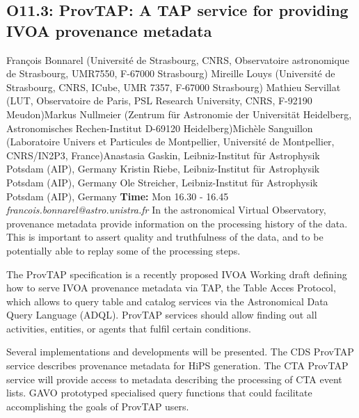 \documentclass{report}
\begin{document}
\subsection*{O11.3: ProvTAP: A TAP service for providing IVOA provenance metadata}
\bigskip
François Bonnarel (Université de Strasbourg, CNRS, Observatoire astronomique de Strasbourg, UMR7550, F-67000 Strasbourg) \newline Mireille Louys (Université de Strasbourg, CNRS, ICube, UMR 7357,  F-67000 Strasbourg) \newline  Mathieu Servillat (LUT, Observatoire de Paris, PSL Research University, CNRS, F-92190 Meudon)\newline  Markus Nullmeier (Zentrum für Astronomie der Universität Heidelberg, Astronomisches Rechen-Institut D-69120 Heidelberg)\newline Michèle Sanguillon (Laboratoire Univers et Particules de Montpellier, Université de Montpellier, CNRS/IN2P3, France)\newline  Anastasia Gaskin, Leibniz-Institut für Astrophysik Potsdam (AIP), Germany
Kristin Riebe, Leibniz-Institut für Astrophysik Potsdam (AIP), Germany
Ole Streicher, Leibniz-Institut für Astrophysik Potsdam (AIP), Germany\newline\newline
{\bf Time:} Mon 16.30 - 16.45\newline
\newline
{\it francois.bonnarel@astro.unistra.fr}\newline
\newline\newline
In the astronomical Virtual Observatory, provenance metadata provide
information on the processing history of the data. This is important to
assert quality and truthfulness of the data, and to be potentially able
to replay some of the processing steps.

The ProvTAP specification is a recently proposed IVOA Working draft
defining how to serve IVOA provenance metadata via TAP, the Table Acces
Protocol, which allows to query table and catalog services via the
Astronomical Data Query Language (ADQL). ProvTAP services should allow
finding out all activities, entities, or agents that fulfil certain
conditions.

Several implementations and developments will be presented. The CDS
ProvTAP service describes provenance metadata for HiPS generation. The
CTA ProvTAP service will provide access to metadata describing the
processing of CTA event lists. GAVO prototyped specialised query
functions that could facilitate accomplishing the goals of ProvTAP users.\newline
\newpage
\end{document}
